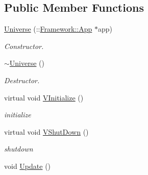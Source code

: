 \subsection*{Public Member Functions}
\begin{DoxyCompactItemize}
\item 
\hypertarget{classContent_1_1Universe_a9b1798028610179329b51a78937fc0db}{
\hyperlink{classContent_1_1Universe_a9b1798028610179329b51a78937fc0db}{Universe} (::\hyperlink{classFramework_1_1App}{Framework::App} $\ast$app)}
\label{classContent_1_1Universe_a9b1798028610179329b51a78937fc0db}

\begin{DoxyCompactList}\small\item\em Constructor. \item\end{DoxyCompactList}\item 
\hypertarget{classContent_1_1Universe_a97addaf913798ee0a1a5a09f7e0718d3}{
\hyperlink{classContent_1_1Universe_a97addaf913798ee0a1a5a09f7e0718d3}{$\sim$Universe} ()}
\label{classContent_1_1Universe_a97addaf913798ee0a1a5a09f7e0718d3}

\begin{DoxyCompactList}\small\item\em Destructor. \item\end{DoxyCompactList}\item 
\hypertarget{classContent_1_1Universe_ab14149b1b2bb928ac8a3f0c0bbdaf93d}{
virtual void \hyperlink{classContent_1_1Universe_ab14149b1b2bb928ac8a3f0c0bbdaf93d}{VInitialize} ()}
\label{classContent_1_1Universe_ab14149b1b2bb928ac8a3f0c0bbdaf93d}

\begin{DoxyCompactList}\small\item\em initialize \item\end{DoxyCompactList}\item 
\hypertarget{classContent_1_1Universe_af13fc887b7c6b74ceec00d81a91bcd9d}{
virtual void \hyperlink{classContent_1_1Universe_af13fc887b7c6b74ceec00d81a91bcd9d}{VShutDown} ()}
\label{classContent_1_1Universe_af13fc887b7c6b74ceec00d81a91bcd9d}

\begin{DoxyCompactList}\small\item\em shutdown \item\end{DoxyCompactList}\item 
\hypertarget{classContent_1_1Universe_ad371c8a2fbdc03d326e2f964bd5b77b1}{
void \hyperlink{classContent_1_1Universe_ad371c8a2fbdc03d326e2f964bd5b77b1}{Update} ()}
\label{classContent_1_1Universe_ad371c8a2fbdc03d326e2f964bd5b77b1}


\end{DoxyCompactItemize}
